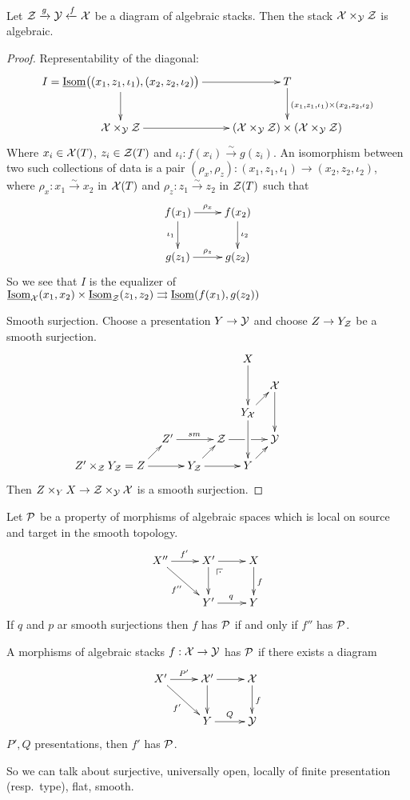  \begin{lemma}
   Let $\Z\xrightarrow g \Y \xleftarrow f \X$ be a diagram of algebraic stacks. Then the
   stack $\X\times_\Y \Z$ is algebraic.
 \end{lemma}
 \begin{proof}
   Representability of the diagonal:
   \[\xymatrix{
    I=\isom\bigl((x_1,z_1,\iota_1),(x_2,z_2,\iota_2)\bigr)\ar[r]\ar[d]& T\ar[d]^{(x_1,z_1,\iota_1)\times (x_2,z_2,\iota_2)}\\
    \X\times_\Y\Z\ar[r]& (\X\times_\Y \Z)\times (\X\times_\Y \Z)
   }\]
   Where $x_i\in\X(T)$, $z_i\in \Z(T)$ and $\iota_i:f(x_i)\xrightarrow\sim g(z_i)$. An
   isomorphism between two such collections of data is a pair
   $(\rho_x,\rho_z):(x_1,z_1,\iota_1)\to (x_2,z_2,\iota_2)$, where
   $\rho_x:x_1\xrightarrow\sim x_2$ in $\X(T)$ and $\rho_z:z_1\xrightarrow\sim z_2$ in
   $\Z(T)$ such that
   \[\xymatrix{
    f(x_1)\ar[r]^{\rho_x}\ar[d]_{\iota_1} & f(x_2)\ar[d]^{\iota_2}\\
    g(z_1)\ar[r]^{\rho_z} & g(z_2)
   }\]
    So we see that $I$ is the equalizer of $\isom_\X(x_1,x_2)\times
   \isom_\Z(z_1,z_2)\rightrightarrows \isom(f(x_1),g(z_2))$

   Smooth surjection. Choose a presentation $Y\to \Y$ and choose $Z\to Y_\Z$ be a smooth
   surjection.
   \[
   \xymatrix@!0{
    & & & & X\ar[dd]\\
    & & & & & \X\ar[dd]\\
    & & & & Y_\X\ar[dd]\ar[ur]\\
    & Z'\ar[rr]^{sm} & & \Z \ar[rr]|\hole & & \Y\\
    \llap{$Z'\times_{\Z}Y_\Z=\;$}Z\ar[ur]\ar[rr] & & Y_\Z \ar[rr]\ar[ur] & & Y\ar[ur]
   }\]
    Then $Z\times_Y X\to \Z\times_\Y \X$ is a smooth surjection.
 \end{proof}
 Let $\P$ be a property of morphisms of algebraic spaces which is local on source and
 target in the smooth topology.
 \[\xymatrix{
    X''\ar[r]^{f'}\ar[dr]_{f''}& X'\ar[r]\ar[d]\ar@{}[dr]|(.25)\pb & X\ar[d]^f\\
    & Y'\ar[r]^q & Y
 }\]
 If $q$ and $p$ ar smooth surjections then $f$ has $\P$ if and only if $f''$ has $\P$.
 \begin{definition}
   A morphisms of algebraic stacks $f:\X\to \Y$ has $\P$ if there exists a diagram
   \[\xymatrix{
    X'\ar[r]^{P'}\ar[dr]_{f'}&\X'\ar[r]\ar[d] & \X\ar[d]^f\\
    & Y\ar[r]^Q & \Y
   }\]
   $P',Q$ presentations, then $f'$ has $\P$.
 \end{definition}
 So we can talk about surjective, universally open, locally of finite presentation
 (resp.~type), flat, smooth.
